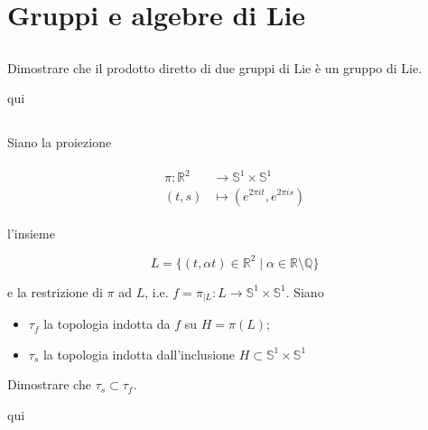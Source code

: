 \chapter{Gruppi e algebre di Lie}

\section{}\label{es3-1}

\begin{tcolorbox}
	Dimostrare che il prodotto diretto di due gruppi di Lie è un gruppo di Lie.
\end{tcolorbox}

qui

\section{}\label{es3-2}

\begin{tcolorbox}
	Siano la proiezione
	
	\begin{align}
		\begin{split}
			\pi : \mathbb{R}^{2} &\to \mathbb{S}^{1} \times \mathbb{S}^{1}\\
			(t,s) &\mapsto (e^{2 \pi i t},e^{2 \pi i s})
		\end{split}
	\end{align}

	l'insieme
	
	\begin{equation}
		L = \{ (t,\alpha t) \in \mathbb{R}^{2} \mid \alpha \in \mathbb{R} \setminus \mathbb{Q} \}
	\end{equation}

	e la restrizione di $ \pi $ ad $ L $, i.e. $ f = \pi_{|L} : L \to \mathbb{S}^{1} \times \mathbb{S}^{1} $. Siano
	
	\begin{itemize}
		\item $ \tau_{f} $ la topologia indotta da $ f $ su $ H = \pi(L) $;
		
		\item $ \tau_{s} $ la topologia indotta dall'inclusione $ H \subset \mathbb{S}^{1} \times \mathbb{S}^{1} $
	\end{itemize}

	Dimostrare che $ \tau_{s} \subset \tau_{f} $.
\end{tcolorbox}

qui

\section{}\label{es3-3}

